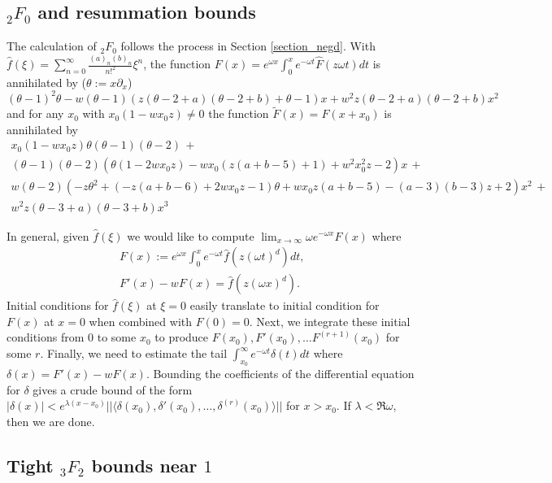 \documentclass[12pt]{article}
\newcommand{\ee}[0] {e}
\numberwithin{equation}{section}
\begin{document}
\subsection{${}_2 F_0$ and resummation bounds}
The calculation of ${}_2 F_0$ follows the process in Section \ref{section_negd}. With $\hat{f}(\xi) = \sum_{n=0}^{\infty} \frac{(a)_n (b)_n}{n!^2} \xi^n$, the function $F(x) = \ee^{\omega x} \int_0^x \ee^{-\omega t} \hat{F}(z \omega t) dt$ is annihilated by ($\theta := x \partial_x$)
\begin{equation*}
(\theta -1)^2 \theta - w (\theta -1)(z (\theta -2+a)
   (\theta -2+b)+\theta -1) x + w^2 z (\theta -2+a) (\theta -2+b) x^2
\end{equation*}
and for any $x_0$ with $x_0 \left(1-w x_0 z\right)\neq 0$ the function $\tilde{F}(x) = F(x+x_0)$ is annihilated by
\begin{gather*}
x_0 \left(1-w x_0 z\right)\theta (\theta -1)(\theta -2)\,+\\
(\theta-1) (\theta-2) \left(\theta  \left(1-2 w x_0 z\right)-w x_0 (z (a+b-5)+1)+w^2 x_0^2 z-2\right)x \,+\\
w (\theta -2)
   \left(-z \theta ^2+\left(-z(a+b-6)+2 w x_0 z-1\right)\theta+w x_0 z (a+b-5)-(a-3)
   (b-3) z+2\right) x^2\,+\\
w^2 z (\theta-3+a) (\theta-3+b) x^3
\end{gather*}

In general, given $\hat{f}(\xi)$ we would like to compute $\lim_{x \to \infty} \omega \ee^{-\omega x}F(x)$ where
\begin{gather*}
F(x) := \ee^{\omega x} \int_0^x \ee^{-\omega t} \hat{f}(z (\omega t)^d) dt\text{,}\\
F'(x) - w F(x) = \hat{f}(z (\omega x)^d)\text{.}
\end{gather*}
Initial conditions for $\hat{f}(\xi)$ at $\xi=0$ easily translate to initial condition for $F(x)$ at $x=0$ when combined with $F(0) = 0$. Next, we integrate these initial conditions from $0$ to some $x_0$ to produce $F(x_0), F'(x_0), \dots F^{(r+1)}(x_0)$ for some $r$. Finally, we need to estimate the tail $\int_{x_0}^{\infty} \ee^{-\omega t} \delta(t) dt$ where $\delta(x) = F'(x) - w F(x)$. Bounding the coefficients of the differential equation for $\delta$ gives a crude bound of the form $|\delta(x)| < \ee^{\lambda (x-x_0)} || \langle \delta(x_0), \delta'(x_0), \dots, \delta^{(r)}(x_0) \rangle ||$ for $x>x_0$. If $\lambda < \Re \omega$, then we are done.


\subsection{Tight ${}_3 F_2$ bounds near $1$}
\end{document}
